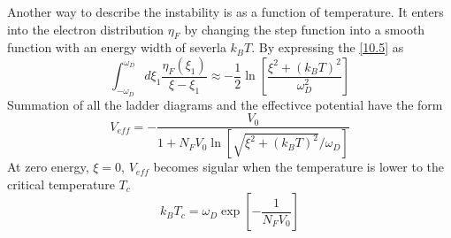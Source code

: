 Another way to describe the instability is as a function of temperature.
It enters into the electron distribution $\eta_F$ by changing the step function into a smooth function with an energy width of severla $k_B T$.
By expressing the \eqref{10.5} as
\begin{equation}
    \int_{-\omega_D}^{\omega_D} d\xi_1 \frac{\eta_F(\xi_1)}{\xi-\xi_1} \approx  - \frac{1}{2} \ln \left[ \frac{\xi^2 + (k_B T)^2}{\omega_D^2}  \right] \label{10.12}
\end{equation}
Summation of all the ladder diagrams and the effectivce potential have the form
\begin{equation}
    V_{eff} = - \frac{V_0}{1+ N_F V_0 \ln \left[ \sqrt{\xi^2 + (k_BT)^2}/\omega_D  \right]}     \label{10.13}
\end{equation}
At zero energy, $\xi=0$, $V_{eff}$ becomes sigular when the temperature is lower to the critical temperature $T_c$
\begin{equation}
    k_B T_c = \omega_D \exp \left[ - \frac{1}{N_F V_0} \right]  \label{10.14}
\end{equation}

